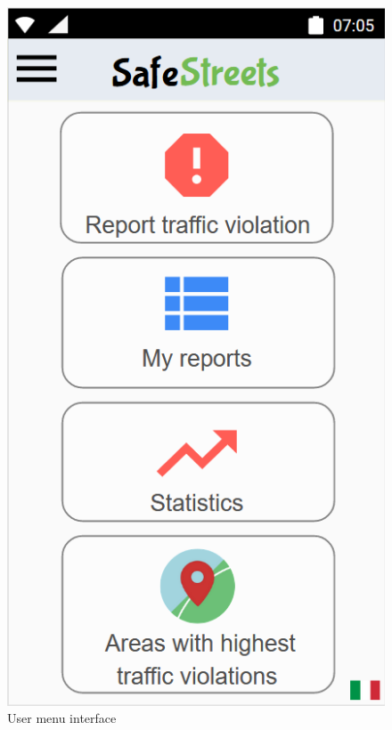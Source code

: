         \begin{figure}[h]
        \centering
        \includegraphics[scale=0.5]{Images/user_menu.png}
        \caption{User menu interface}
    \end{figure}
